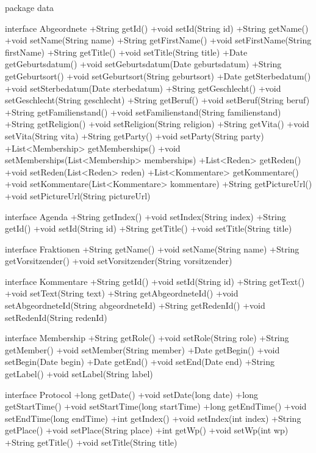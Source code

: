 package data {

  interface Abgeordnete {
    +String getId()
    +void setId(String id)
    +String getName()
    +void setName(String name)
    +String getFirstName()
    +void setFirstName(String firstName)
    +String getTitle()
    +void setTitle(String title)
    +Date getGeburtsdatum()
    +void setGeburtsdatum(Date geburtsdatum)
    +String getGeburtsort()
    +void setGeburtsort(String geburtsort)
    +Date getSterbedatum()
    +void setSterbedatum(Date sterbedatum)
    +String getGeschlecht()
    +void setGeschlecht(String geschlecht)
    +String getBeruf()
    +void setBeruf(String beruf)
    +String getFamilienstand()
    +void setFamilienstand(String familienstand)
    +String getReligion()
    +void setReligion(String religion)
    +String getVita()
    +void setVita(String vita)
    +String getParty()
    +void setParty(String party)
    +List<Membership> getMemberships()
    +void setMemberships(List<Membership> memberships)
    +List<Reden> getReden()
    +void setReden(List<Reden> reden)
    +List<Kommentare> getKommentare()
    +void setKommentare(List<Kommentare> kommentare)
    +String getPictureUrl()
    +void setPictureUrl(String pictureUrl)
  }

  interface Agenda {
    +String getIndex()
    +void setIndex(String index)
    +String getId()
    +void setId(String id)
    +String getTitle()
    +void setTitle(String title)
  }

  interface Fraktionen {
    +String getName()
    +void setName(String name)
    +String getVorsitzender()
    +void setVorsitzender(String vorsitzender)
  }

  interface Kommentare {
    +String getId()
    +void setId(String id)
    +String getText()
    +void setText(String text)
    +String getAbgeordneteId()
    +void setAbgeordneteId(String abgeordneteId)
    +String getRedenId()
    +void setRedenId(String redenId)
  }

  interface Membership {
    +String getRole()
    +void setRole(String role)
    +String getMember()
    +void setMember(String member)
    +Date getBegin()
    +void setBegin(Date begin)
    +Date getEnd()
    +void setEnd(Date end)
    +String getLabel()
    +void setLabel(String label)
  }

  interface Protocol {
    +long getDate()
    +void setDate(long date)
    +long getStartTime()
    +void setStartTime(long startTime)
    +long getEndTime()
    +void setEndTime(long endTime)
    +int getIndex()
    +void setIndex(int index)
    +String getPlace()
    +void setPlace(String place)
    +int getWp()
    +void setWp(int wp)
    +String getTitle()
    +void setTitle(String title)
  }

}
